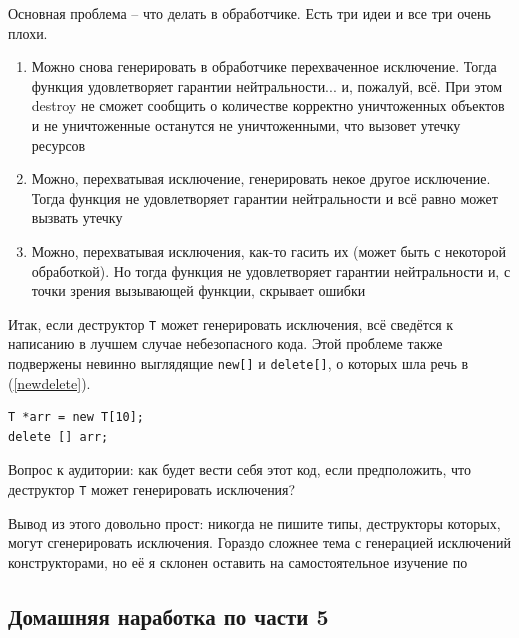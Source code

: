 \documentclass[a4paper,12pt,oneside]{article}
\begin{document}
Основная проблема -- что делать в обработчике. Есть три идеи и все три очень плохи.
\begin{enumerate}
\item
Можно снова генерировать в обработчике перехваченное исключение. Тогда функция удовлетворяет гарантии нейтральности... и, пожалуй, всё. При этом destroy не сможет сообщить о количестве корректно уничтоженных объектов и не уничтоженные останутся не уничтоженными, что вызовет утечку ресурсов
\item
Можно, перехватывая исключение, генерировать некое другое исключение. Тогда функция не удовлетворяет гарантии нейтральности и всё равно может вызвать утечку
\item
Можно, перехватывая исключения, как-то гасить их (может быть с некоторой обработкой). Но тогда функция не удовлетворяет гарантии нейтральности и, с точки зрения вызывающей функции, скрывает ошибки
\end{enumerate}

Итак, если деструктор \lstinline!T! может генерировать исключения, всё сведётся к написанию в лучшем случае небезопасного кода. Этой проблеме также подвержены невинно выглядящие \lstinline!new[]! и \lstinline!delete[]!, о которых шла речь в (\ref{newdelete}).

\begin{lstlisting}
T *arr = new T[10];
delete [] arr;
\end{lstlisting}

Вопрос к аудитории: как будет вести себя этот код, если предположить, что деструктор \lstinline!T! может генерировать исключения?

Вывод из этого довольно прост: никогда не пишите типы, деструкторы которых, могут сгенерировать исключения. Гораздо сложнее тема с генерацией исключений конструкторами, но её я склонен оставить на самостоятельное изучение по \cite{exceptionalcpp}

\pagebreak
\subsection{Домашняя наработка по части 5}
\end{document}
